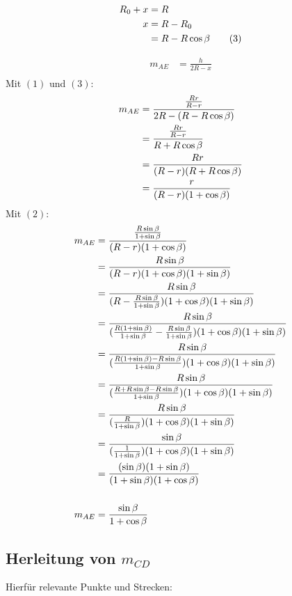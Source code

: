 \begin{align*}
	R_0 + x &= R \\
	x &= R - R_0 \\
	&= R - R \cos\beta \tag{3}
\end{align*}

\begin{samepage}
	\begin{align*}
		m_{AE} &= \frac{h}{2R - x} \\
	\end{align*}
	Mit $(1)$ und $(3)$: \nopagebreak
	\begin{align*}
		m_{AE} &= \frac{\frac{Rr}{R-r}}{2R - (R-R \cos\beta)} \\
		&= \frac{\frac{Rr}{R-r}}{R+R \cos\beta} \\
		&= \frac{Rr}{(R-r)(R+R \cos\beta)} \\
		&= \frac{r}{(R-r)(1+\cos\beta)}
	\end{align*}
	Mit $(2)$: \nopagebreak
	\begin{align*}
		m_{AE} &= \frac{\frac{R \sin\beta}{1+\sin\beta}}{(R-r)(1+\cos\beta)} \\
		&= \frac{R \sin\beta}{(R-r)(1+\cos\beta)(1+\sin\beta)} \\
		&= \frac{R \sin\beta}{(R-\frac{R \sin\beta}{1+\sin\beta})(1+\cos\beta)(1+\sin\beta)} \\
		&= \frac{R \sin\beta}{(\frac{R(1+\sin\beta)}{1+\sin\beta}-\frac{R \sin\beta}{1+\sin\beta})(1+\cos\beta)(1+\sin\beta)} \\
		&= \frac{R \sin\beta}{(\frac{R(1+\sin\beta) - R\sin\beta}{1+\sin\beta})(1+\cos\beta)(1+\sin\beta)} \\
		&= \frac{R \sin\beta}{(\frac{R+R\sin\beta-R\sin\beta}{1+\sin\beta})(1+\cos\beta)(1+\sin\beta)} \\
		&= \frac{R \sin\beta}{(\frac{R}{1+\sin\beta})(1+\cos\beta)(1+\sin\beta)} \\
		&= \frac{\sin\beta}{(\frac{1}{1+\sin\beta})(1+\cos\beta)(1+\sin\beta)} \\
		&= \frac{(\sin\beta)(1+\sin\beta)}{(1+\sin\beta)(1+\cos\beta)} \\[15pt]
		m_{AE} &= \frac{\sin\beta}{1+\cos\beta}
	\end{align*}
\end{samepage}

\pagebreak
\subsection{Herleitung von $m_{CD}$}
Hierfür relevante Punkte und Strecken:

